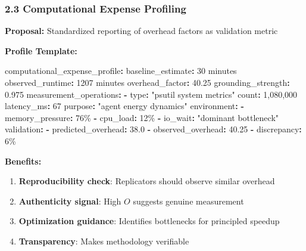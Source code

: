 \documentclass[
]{article}
\newenvironment{Shaded}{}{}
\newcommand{\AttributeTok}[1]{\textcolor[rgb]{0.49,0.56,0.16}{#1}}
\newcommand{\DecValTok}[1]{\textcolor[rgb]{0.25,0.63,0.44}{#1}}
\newcommand{\FloatTok}[1]{\textcolor[rgb]{0.25,0.63,0.44}{#1}}
\newcommand{\FunctionTok}[1]{\textcolor[rgb]{0.02,0.16,0.49}{#1}}
\newcommand{\KeywordTok}[1]{\textcolor[rgb]{0.00,0.44,0.13}{\textbf{#1}}}
\newcommand{\StringTok}[1]{\textcolor[rgb]{0.25,0.44,0.63}{#1}}
\providecommand{\tightlist}{%
  \setlength{\itemsep}{0pt}\setlength{\parskip}{0pt}}
\begin{document}
\subsubsection{2.3 Computational Expense
Profiling}\label{computational-expense-profiling}

\textbf{Proposal:} Standardized reporting of overhead factors as
validation metric

\textbf{Profile Template:}

\begin{Shaded}
\begin{Highlighting}[]
\FunctionTok{computational\_expense\_profile}\KeywordTok{:}
\AttributeTok{  }\FunctionTok{baseline\_estimate}\KeywordTok{:}\AttributeTok{ 30 minutes}
\AttributeTok{  }\FunctionTok{observed\_runtime}\KeywordTok{:}\AttributeTok{ 1207 minutes}
\AttributeTok{  }\FunctionTok{overhead\_factor}\KeywordTok{:}\AttributeTok{ }\FloatTok{40.25}
\AttributeTok{  }\FunctionTok{grounding\_strength}\KeywordTok{:}\AttributeTok{ }\FloatTok{0.975}
\AttributeTok{  }\FunctionTok{measurement\_operations}\KeywordTok{:}
\AttributeTok{    }\KeywordTok{{-}}\AttributeTok{ }\FunctionTok{type}\KeywordTok{:}\AttributeTok{ }\StringTok{"psutil system metrics"}
\AttributeTok{      }\FunctionTok{count}\KeywordTok{:}\AttributeTok{ 1,080,000}
\AttributeTok{      }\FunctionTok{latency\_ms}\KeywordTok{:}\AttributeTok{ }\DecValTok{67}
\AttributeTok{      }\FunctionTok{purpose}\KeywordTok{:}\AttributeTok{ }\StringTok{"agent energy dynamics"}
\AttributeTok{  }\FunctionTok{environment}\KeywordTok{:}
\AttributeTok{    }\KeywordTok{{-}}\AttributeTok{ }\FunctionTok{memory\_pressure}\KeywordTok{:}\AttributeTok{ 76\%}
\AttributeTok{    }\KeywordTok{{-}}\AttributeTok{ }\FunctionTok{cpu\_load}\KeywordTok{:}\AttributeTok{ 12\%}
\AttributeTok{    }\KeywordTok{{-}}\AttributeTok{ }\FunctionTok{io\_wait}\KeywordTok{:}\AttributeTok{ }\StringTok{"dominant bottleneck"}
\AttributeTok{  }\FunctionTok{validation}\KeywordTok{:}
\AttributeTok{    }\KeywordTok{{-}}\AttributeTok{ }\FunctionTok{predicted\_overhead}\KeywordTok{:}\AttributeTok{ }\FloatTok{38.0}
\AttributeTok{    }\KeywordTok{{-}}\AttributeTok{ }\FunctionTok{observed\_overhead}\KeywordTok{:}\AttributeTok{ }\FloatTok{40.25}
\AttributeTok{    }\KeywordTok{{-}}\AttributeTok{ }\FunctionTok{discrepancy}\KeywordTok{:}\AttributeTok{ 6\%}
\end{Highlighting}
\end{Shaded}

\textbf{Benefits:}

\begin{enumerate}
\def\labelenumi{\arabic{enumi}.}
\tightlist
\item
  \textbf{Reproducibility check}: Replicators should observe similar
  overhead
\item
  \textbf{Authenticity signal}: High \(O\) suggests genuine measurement
\item
  \textbf{Optimization guidance}: Identifies bottlenecks for principled
  speedup
\item
  \textbf{Transparency}: Makes methodology verifiable
\end{enumerate}
\end{document}
